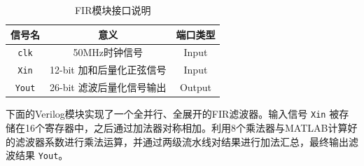 \begin{table}[htbp]
  \centering
  \begin{tabular}{ccc}
    \toprule
     信号名 & 意义 & 端口类型\\
    \midrule
      \texttt{clk} & 50MHz时钟信号 & Input \\
     \texttt{Xin} & 12-bit 加和后量化正弦信号 & Input \\
     \texttt{Yout} & 26-bit 滤波后量化信号输出 & Output \\
    \bottomrule
  \end{tabular}
  \caption{FIR模块接口说明}
  \label{table:interface_fir_exp5}
\end{table}

下面的Verilog模块实现了一个全并行、全展开的FIR滤波器。输入信号 \texttt{Xin} 被存储在16个寄存器中，之后通过加法器对称相加。利用8个乘法器与MATLAB计算好的滤波器系数进行乘法运算，并通过两级流水线对结果进行加法汇总，最终输出滤波结果 \texttt{Yout}。

